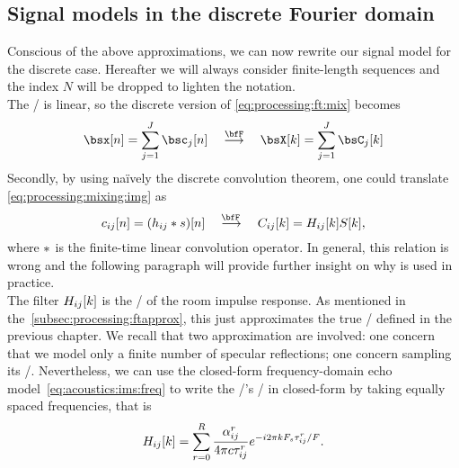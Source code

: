 \subsection{Signal models in the discrete Fourier domain}\label{sec:processing:fouriermodel}
Conscious of the above approximations, we can now rewrite our signal model for the discrete case.
Hereafter we will always consider finite-length sequences and the index $N$ will be dropped to lighten the notation.
\\The \DFT/ is linear, so the discrete version of \cref{eq:processing:ft:mix} becomes
\begin{equation}\label{eq:processing:dft:mix}
    {\mics}[ n] = \sum_{\idxSrc=1}^{\numSrcs} {\imgs}_\idxSrc[ n]
    \mathspace\overset{\discreteFT}{\kto}\mathspace
    {\MICS}[ k] = \sum_{\idxSrc=1}^{\numSrcs} {\IMGS}_\idxSrc[ k]
\end{equation}
Secondly, by using na\"ively the discrete convolution theorem, one could translate \cref{eq:processing:mixing:img} as
\begin{equation}\label{eq:processing:discreteModel}
    {\img}_{\idxMicSrc}[n] = ({\rir}_{\idxMicSrc} \convDis {\src})[n]
    \mathspace\overset{\discreteFT{}}{\kto}\mathspace
    {C}_{\idxMicSrc}[k] = {H}_{\idxMicSrc}[k] {S}[k]
    ,
\end{equation}
where $\ast$ is the finite-time linear convolution operator. In general, this relation is wrong and the following paragraph will provide further insight on why is used in practice.
\\The filter ${H}_{ij}[k]$ is the \DFT/ of the room impulse response.
As mentioned in the~\cref{subsec:processing:ftapprox}, this just approximates the true \RTF/ defined in the previous chapter.
We recall that two approximation are involved: one concern that we model only a finite number of specular reflections; one concern sampling its \FT/.
Nevertheless, we can use the closed-form frequency-domain echo model~\cref{eq:acoustics:ims:freq} to write the \RTF/'s \DFT/ in closed-form by taking equally spaced frequencies, that is
\begin{equation}\label{eq:processing:discreteModel:rir}
    {H}_{ij}[ k] = \sum_{r=0}^{R}
                \frac{\alpha_{ij}^r}{4 \pi c \tau_{ij}^r}
                {e}^{- {i} 2 \pi k F_s \tau_{ij}^r / F}
    .
\end{equation}

